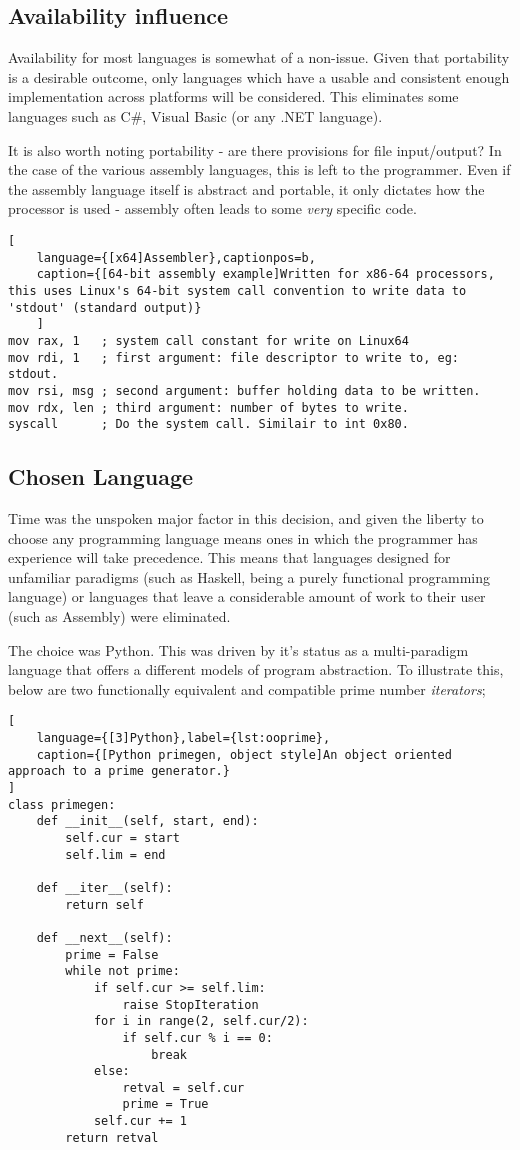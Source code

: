 \documentclass[10pt,a4paper,notitlepage]{report}
\begin{document}
\subsection{Availability influence}
Availability for most languages is somewhat of a non-issue. Given that portability is a desirable outcome, only languages which have a usable and consistent enough implementation across platforms will be considered. This eliminates some languages such as C\#, Visual Basic (or any .NET language).

It is also worth noting portability - are there provisions for file input/output? In the case of the various assembly languages, this is left to the programmer. Even if the assembly language itself is abstract and portable, it only dictates how the processor is used - assembly often leads to some \emph{very} specific code.

\begin{lstlisting}[
	language={[x64]Assembler},captionpos=b,
	caption={[64-bit assembly example]Written for x86-64 processors, this uses Linux's 64-bit system call convention to write data to 'stdout' (standard output)}
	]
mov rax, 1   ; system call constant for write on Linux64
mov rdi, 1   ; first argument: file descriptor to write to, eg: stdout.
mov rsi, msg ; second argument: buffer holding data to be written.
mov rdx, len ; third argument: number of bytes to write.
syscall      ; Do the system call. Similair to int 0x80.
\end{lstlisting}

\subsection{Chosen Language}
Time was the unspoken major factor in this decision, and given the liberty to choose any programming language means ones in which the programmer has experience will take precedence. This means that languages designed for unfamiliar paradigms (such as Haskell, being a purely functional programming language\cite{haskfunc}) or languages that leave a considerable amount of work to their user (such as Assembly) were eliminated.

The choice was Python. This was driven by it's status as a multi-paradigm language that offers a different models of program abstraction.
To illustrate this, below are two functionally equivalent and compatible prime number \emph{iterators};
\begin{lstlisting}[
	language={[3]Python},label={lst:ooprime},
	caption={[Python primegen, object style]An object oriented approach to a prime generator.}
]
class primegen:
    def __init__(self, start, end):
        self.cur = start
        self.lim = end

    def __iter__(self):
        return self

    def __next__(self):
        prime = False
        while not prime:
            if self.cur >= self.lim:
                raise StopIteration
            for i in range(2, self.cur/2):
                if self.cur % i == 0:
                    break
            else:
                retval = self.cur
                prime = True
            self.cur += 1
        return retval
\end{lstlisting}
\end{document}

